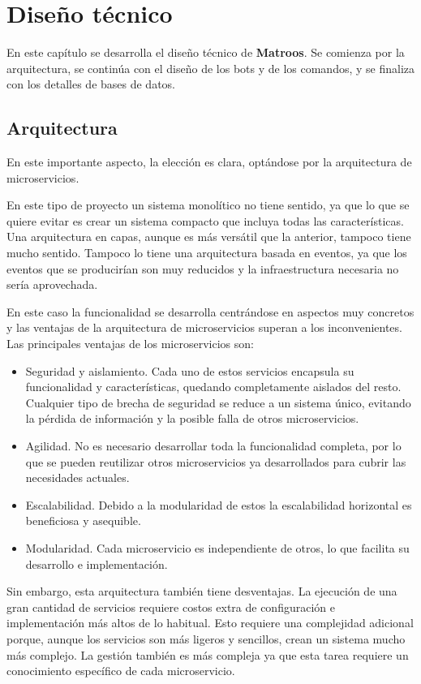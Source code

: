 \chapter{Diseño técnico}
\label{cap:5}
 
En este capítulo se desarrolla el diseño técnico de \textbf{Matroos}. Se comienza por la arquitectura, se continúa con el diseño de los bots y de los comandos, y se finaliza con los detalles de bases de datos.

\section{Arquitectura}

En este importante aspecto, la elección es clara, optándose por la arquitectura de microservicios.

En este tipo de proyecto un sistema monolítico no tiene sentido, ya que lo que se quiere evitar es crear un sistema compacto que incluya todas las características. Una arquitectura en capas, aunque es más versátil que la anterior, tampoco tiene mucho sentido. Tampoco lo tiene una arquitectura basada en eventos, ya que los eventos que se producirían son muy reducidos y la infraestructura necesaria no sería aprovechada.

En este caso la funcionalidad se desarrolla centrándose en aspectos muy concretos y las ventajas de la arquitectura de microservicios superan a los inconvenientes. Las principales ventajas de los microservicios son:

\begin{itemize}
	\item Seguridad y aislamiento. Cada uno de estos servicios encapsula su funcionalidad y características, quedando completamente aislados del resto. Cualquier tipo de brecha de seguridad se reduce a un sistema único, evitando la pérdida de información y la posible falla de otros microservicios.
	\item Agilidad. No es necesario desarrollar toda la funcionalidad completa, por lo que se pueden reutilizar otros microservicios ya desarrollados para cubrir las necesidades actuales.
	\item Escalabilidad. Debido a la modularidad de estos la escalabilidad horizontal es beneficiosa y asequible.
	\item Modularidad. Cada microservicio es independiente de otros, lo que facilita su desarrollo e implementación.
\end{itemize}

Sin embargo, esta arquitectura también tiene desventajas. La ejecución de una gran cantidad de servicios requiere costos extra de configuración e implementación más altos de lo habitual. Esto requiere una complejidad adicional porque, aunque los servicios son más ligeros y sencillos, crean un sistema mucho más complejo. La gestión también es más compleja ya que esta tarea requiere un conocimiento específico de cada microservicio.


